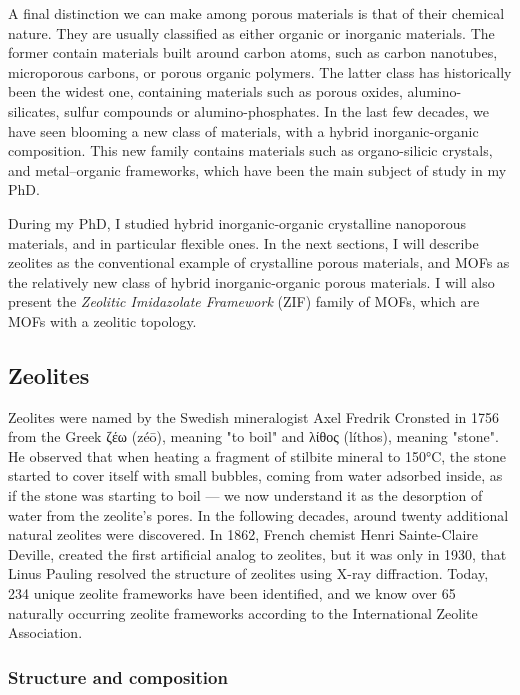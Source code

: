 \documentclass[thesis]{subfiles}
\begin{document}
A final distinction we can make among porous materials is that of their chemical
nature. They are usually classified as either organic or inorganic materials.
The former contain materials built around carbon atoms, such as carbon
nanotubes, microporous carbons, or porous organic polymers. The latter class has
historically been the widest one, containing materials such as porous oxides,
alumino-silicates, sulfur compounds or alumino-phosphates. In the last few
decades, we have seen blooming a new class of materials, with a hybrid
inorganic-organic composition. This new family contains materials such as
organo-silicic crystals, and metal--organic frameworks, which have been the main
subject of study in my PhD.

During my PhD, I studied hybrid inorganic-organic crystalline nanoporous
materials, and in particular flexible ones. In the next sections, I will
describe zeolites as the conventional example of crystalline porous materials,
and MOFs as the relatively new class of hybrid inorganic-organic porous
materials. I will also present the \emph{Zeolitic Imidazolate Framework} (ZIF)
family of MOFs, which are MOFs with a zeolitic topology.

\subsection{Zeolites}

Zeolites were named by the Swedish mineralogist Axel Fredrik Cronsted in
1756\cite{Ferey2001} from the Greek \textgreek{ζέω} (zéō), meaning "to boil" and
\textgreek{λίθος} (líthos), meaning "stone". He observed that when heating a
fragment of stilbite mineral to 150°C, the stone started to cover itself with
small bubbles, coming from water adsorbed inside, as if the stone was starting
to boil --- we now understand it as the desorption of water from the zeolite's
pores. In the following decades, around twenty additional natural zeolites were
discovered. In 1862, French chemist Henri Sainte-Claire Deville, created the
first artificial analog to zeolites, but it was only in 1930, that Linus Pauling
resolved the structure of zeolites using X-ray diffraction. Today, 234 unique
zeolite frameworks have been identified, and we know over 65 naturally occurring
zeolite frameworks according to the International Zeolite Association\cite{iza-website}.

\subsubsection{Structure and composition}
\end{document}
